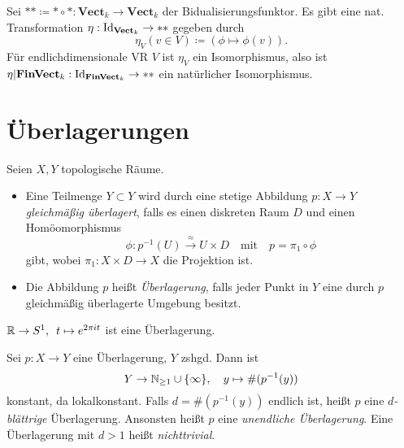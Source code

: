 \documentclass{cheat-sheet}
\begin{document}
\begin{samepage}

\begin{bsp}
  Sei $** \coloneqq * \circ * : \mathbf{Vect}_k \to \mathbf{Vect}_k$ der Bidualisierungsfunktor. Es gibt eine nat. Transformation $\eta : \operatorname{Id}_{\mathbf{Vect}_k} \to **$ gegeben durch
  \[ \eta_V(v \in V) \coloneqq (\phi \mapsto \phi(v)). \]
  Für endlichdimensionale VR $V$ ist $\eta_V$ ein Isomorphismus, also ist $\eta|\mathbf{FinVect}_k : \operatorname{Id}_{\mathbf{FinVect}_k} \to **$ ein natürlicher Isomorphismus.
\end{bsp}


\section{Überlagerungen}


\begin{defn}
  Seien $X, Y$ topologische Räume.
  \begin{itemize}
    \item Eine Teilmenge $Y \subset Y$ wird durch eine stetige Abbildung $p : X \to Y$ \emph{gleichmäßig überlagert}, falls es einen diskreten Raum $D$ und einen Homöomorphismus
    \[
      \phi : p^{-1}(U) \xrightarrow{\approx} U \times D
      \quad \text{mit} \quad
      p = \pi_1 \circ \phi
    \]
    gibt, wobei $\pi_1 : X \times D \to X$ die Projektion ist.
    \item Die Abbildung $p$ heißt \emph{Überlagerung}, falls jeder Punkt in $Y$ eine durch $p$ gleichmäßig überlagerte Umgebung besitzt.
  \end{itemize}
\end{defn}

\end{samepage}

\begin{bsp}
  $\mathbb{R} \to S^1, \enspace t \mapsto e^{2 \pi it}$ ist eine Überlagerung.
\end{bsp}

\begin{bem}
  Sei $p : X \to Y$ eine Überlagerung, $Y$ zshgd. Dann ist
  \[ Y \to \mathbb{N}_{\geq 1} \cup \{ \infty \}, \quad y \mapsto \text{\#} (p^{-1}(y)) \]
  konstant, da lokalkonstant.
  Falls $d = \text{\#} (p^{-1}(y))$ endlich ist, heißt $p$ eine \emph{$d$-blättrige} Überlagerung. Ansonsten heißt $p$ eine \emph{unendliche Überlagerung}. Eine Überlagerung mit $d > 1$ heißt \emph{nichttrivial}.
\end{bem}
\end{document}
